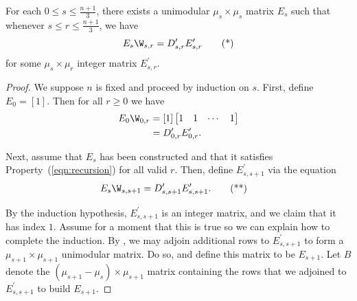 \begin{theorem}\label{t:bier-std}
For each $0 \leq s \leq \frac{n+1}{3}$, there exists a unimodular $\mu_s \times \mu_s$ matrix $E_{s}$ such that whenever $s \leq r \leq \frac{n+1}{3}$, we have
\begin{equation}\label{eqn:recursion}
    E_{s}\W_{s,r} = D_{s,r}^{\prime} E_{s,r}^{\prime} \tag{*}
\end{equation}
for some $\mu_{s} \times \mu_{r}$ integer matrix $E_{s,r}^{\prime}$.
\end{theorem}
\begin{proof}
We suppose $n$ is fixed and proceed by induction on $s$.  First, define $E_{0} = [1]$.  Then for all $r \geq 0$ we have
\begin{align*}
E_{0}\W_{0,r} &= [1] \begin{bmatrix} 1 & 1 & \cdots & 1 \end{bmatrix}\\
&= D_{0,r}^{\prime} E_{0,r}^{\prime}.
\end{align*}

Next, assume that $E_{s}$ has been constructed and that it satisfies Property~(\ref{eqn:recursion}) for all valid $r$.  Then, define $E_{s,s+1}^\prime$ via the equation
\begin{align} \label{eqn:index1}
    E_{s}\W_{s,s+1} &= D_{s,s+1}^{\prime} E_{s,s+1}^{\prime}.  \tag{**}
\end{align}

By the induction hypothesis, $E_{s,s+1}^{\prime}$ is an integer matrix, and we claim that it has index $1$.  Assume for a moment that this is true so we can explain how to complete the induction.  By \cite[Proposition 2]{wilson_classic}, we may adjoin additional rows to $E_{s,s+1}^{\prime}$ to form a $\mu_{s+1} \times \mu_{s+1}$ unimodular matrix.  Do so, and define this matrix to be $E_{s+1}$.  Let $B$ denote the $(\mu_{s+1}-\mu_{s}) \times \mu_{s+1}$ matrix containing the rows that we adjoined to $E_{s,s+1}^{\prime}$ to build $E_{s+1}$.  


\end{proof}
